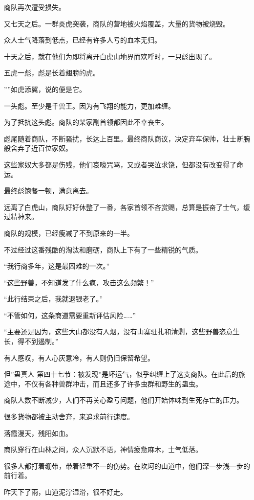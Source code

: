 \begin{this_body}
商队再次遭受损失。

又七天之后。一群炎虎突袭，商队的营地被火焰覆盖，大量的货物被烧毁。

众人士气降落到低点，已经有许多人亏的血本无归。

十天之后，就在他们为即将离开白虎山地界而欢呼时，一只彪出现了。

五虎一彪，彪是长着翅膀的虎。

””如虎添翼，说的便是它。

一头彪。至少是千兽王。因为有飞翔的能力，更加难缠。

为了抵抗这头彪。商队的某家副首领都因此不幸丧生。

彪尾随着商队，不断骚扰，长达上百里。最终商队商议，决定弃车保帅，壮士断腕般舍弃了近百位家奴。

这些家奴大多都是伤残，他们哀嚎咒骂，又或者哭泣求饶，但都没有改变得了命运。

最终彪饱餐一顿，满意离去。

远离了白虎山，商队好好休整了一番，各家首领不吝赏赐，总算是振奋了士气，缓过精神来。

商队的规模，已经瘦减了不到原来的一半。

不过经过这番残酷的淘汰和磨砺，商队上下有了一些精锐的气质。

“我行商多年，这是最困难的一次。”

“这些野兽，不知道发了什么疯，攻击这么频繁！”

“此行结束之后，我就退银老了。”

“不管如何，这条商道需要重新评估风险……”

“主要还是因为，这些大山都没有人烟，没有山寨驻扎和清剿，这些野兽恣意生长，得不到遏制。”

有人感叹，有人心灰意冷，有人则仍旧保留希望。

但”蛊真人 第四十七节：被发现”是坏运气，似乎纠缠上了这支商队。在此后的旅途中，不仅有各种兽群冲击，而且还多了许多虫群和野生的蛊虫。

商队人数不断减少，人们不再关心盈亏问题，他们开始体味到生死存亡的压力。

很多货物都被主动舍弃，来追求前行速度。

落霞漫天，残阳如血。

商队穿行在山林之间，众人沉默不语，神情疲惫麻木，士气低落。

很多人都打着绷带，带着轻重不一的伤势。在坎坷的山道中，他们深一步浅一步的前行着。

昨天下了雨，山道泥泞湿滑，很不好走。


\end{this_body}
